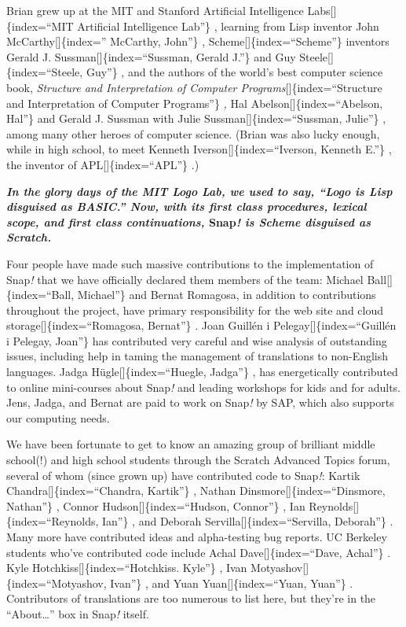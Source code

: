 \documentclass[
  letterpaper,
]{book}
\begin{document}
Brian grew up at the MIT and Stanford Artificial Intelligence
Labs{[}{]}\{index=``MIT Artificial Intelligence Lab''\} , learning from
Lisp inventor John McCarthy{[}{]}\{index='' McCarthy, John''\} ,
Scheme{[}{]}\{index=``Scheme''\} inventors Gerald J.
Sussman{[}{]}\{index=``Sussman, Gerald J.''\} and Guy
Steele{[}{]}\{index=``Steele, Guy''\} , and the authors of the world's
best computer science book, \emph{Structure and Interpretation of
Computer Programs}{[}{]}\{index=``Structure and Interpretation of
Computer Programs''\} \emph{,} Hal Abelson{[}{]}\{index=``Abelson,
Hal''\} and Gerald J. Sussman with Julie Sussman{[}{]}\{index=``Sussman,
Julie''\} , among many other heroes of computer science. (Brian was also
lucky enough, while in high school, to meet Kenneth
Iverson{[}{]}\{index=``Iverson, Kenneth E.''\} , the inventor of
APL{[}{]}\{index=``APL''\} .)

\textbf{\emph{In the glory days of the MIT Logo Lab, we used to say,
``Logo is Lisp disguised as BASIC.'' Now, with its first class
procedures, lexical scope, and first class continuations,} Snap\emph{!
is Scheme disguised as Scratch.}}

Four people have made such massive contributions to the implementation
of Snap\emph{!} that we have officially declared them members of the
team: Michael Ball{[}{]}\{index=``Ball, Michael''\} and Bernat Romagosa,
in addition to contributions throughout the project, have primary
responsibility for the web site and cloud
storage{[}{]}\{index=``Romagosa, Bernat''\} . Joan Guillén i
Pelegay{[}{]}\{index=``Guillén i Pelegay, Joan''\} has contributed very
careful and wise analysis of outstanding issues, including help in
taming the management of translations to non-English languages. Jadga
Hügle{[}{]}\{index=``Huegle, Jadga''\} , has energetically contributed
to online mini-courses about Snap\emph{!} and leading workshops for kids
and for adults. Jens, Jadga, and Bernat are paid to work on Snap\emph{!}
by SAP, which also supports our computing needs.

We have been fortunate to get to know an amazing group of brilliant
middle school(!) and high school students through the Scratch Advanced
Topics forum, several of whom (since grown up) have contributed code to
Snap\emph{!}: Kartik Chandra{[}{]}\{index=``Chandra, Kartik''\} , Nathan
Dinsmore{[}{]}\{index=``Dinsmore, Nathan''\} , Connor
Hudson{[}{]}\{index=``Hudson, Connor''\} , Ian
Reynolds{[}{]}\{index=``Reynolds, Ian''\} , and Deborah
Servilla{[}{]}\{index=``Servilla, Deborah''\} . Many more have
contributed ideas and alpha-testing bug reports. UC Berkeley students
who've contributed code include Achal Dave{[}{]}\{index=``Dave,
Achal''\} . Kyle Hotchkiss{[}{]}\{index=``Hotchkiss. Kyle''\} , Ivan
Motyashov{[}{]}\{index=``Motyashov, Ivan''\} , and Yuan
Yuan{[}{]}\{index=``Yuan, Yuan''\} . Contributors of translations are
too numerous to list here, but they're in the ``About\ldots{}'' box in
Snap\emph{!} itself.
\end{document}
